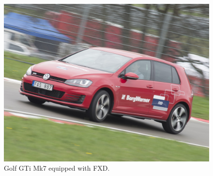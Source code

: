 \begin{figure}[h]
	\centering
	\includegraphics[width=1\textwidth]{Pictures/golf}
	\caption {Golf GTi Mk7 equipped with FXD.}
	\label{golf}
\end{figure}